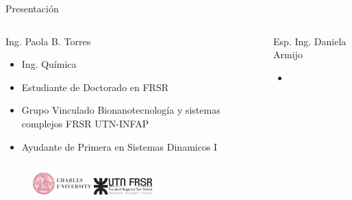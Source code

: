 \documentclass{beamer}
\begin{document}
\begin{frame}{Presentación}
  
  \begin{columns}
    \begin{column}{0.5\linewidth}
      \begin{block}{Ing. Paola B. Torres}
        \begin{itemize}
          \item Ing. Química
          \item Estudiante de Doctorado en FRSR 
          \item Grupo Vinculado Bionanotecnología y sistemas complejos FRSR UTN-INFAP 
          \item Ayudante de Primera en Sistemas Dinamicos I 
        \end{itemize}
      \end{block}



  \end{column}

    \begin{column}{0.5\linewidth}

      \begin{block}{Esp. Ing. Daniela Armijo} 
        \begin{itemize}
          \item 
        \end{itemize}
      \end{block}
   
    \end{column}

  \end{columns}
 
  \begin{figure}
    \includegraphics[width=0.2\textwidth]{images/logo_charles.png}
    \includegraphics[width=0.2\textwidth]{images/Logo_UTN.png}
  \end{figure}









\end{frame}
\end{document}
